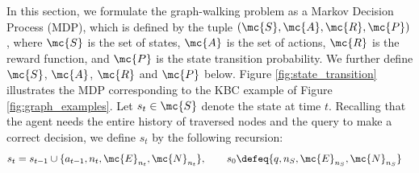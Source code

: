 \documentclass{article}
\begin{document}
	In this section, we formulate the graph-walking problem as a Markov Decision Process (MDP), which is defined by the tuple $(\mc{S}, \mc{A}, \mc{R}, \mc{P})$, where $\mc{S}$ is the set of states, $\mc{A}$ is the set of actions, $\mc{R}$ is the reward function, and $\mc{P}$ is the state transition probability. We further define $\mc{S}$, $\mc{A}$, $\mc{R}$ and $\mc{P}$ below. Figure \ref{fig:state_transition} illustrates the MDP corresponding to the KBC example of Figure \ref{fig:graph_examples}. Let $s_t \in \mc{S}$ denote the state at time $t$. Recalling that the agent needs the entire history of traversed nodes and the query to make a correct decision, we define $s_t$ by the following recursion:
    	\begin{align}
    	    s_t	    &=	    
    	                s_{t-1} \cup \{a_{t-1}, n_t, \mc{E}_{n_t}, \mc{N}_{n_t}\}, \qquad s_0 \defeq \{q, n_S, \mc{E}_{n_S}, \mc{N}_{n_S}\}
    	\label{Equ:\modelname:s_t1}
    	\end{align}
\end{document}
